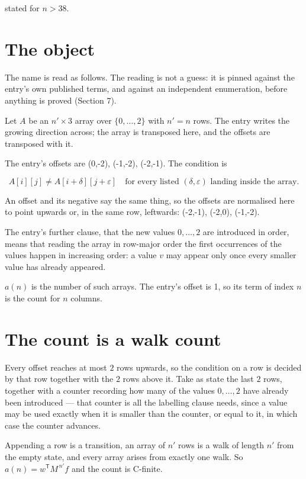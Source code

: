 \documentclass[11pt]{article}
\theoremstyle{definition}
\begin{document}
stated for $n > 38$.

\section{The object}

The name is read as follows. The reading is not a guess: it is pinned against the entry's own published terms, and against an independent enumeration, before anything is proved (Section 7).

Let $A$ be an $n' \times 3$ array over $\{0,\dots,2\}$ with $n' = n$ rows. The entry writes the growing direction across; the array is transposed here, and the offsets are transposed with it.

The entry's offsets are (0,-2), (-1,-2), (-2,-1). The condition is

\[A[i][j] \ne A[i{+}\delta][j{+}\varepsilon]\quad\text{for every listed }(\delta,\varepsilon)\text{ landing inside the array.}\]

An offset and its negative say the same thing, so the offsets are normalised here to point upwards or, in the same row, leftwards: (-2,-1), (-2,0), (-1,-2).

The entry's further clause, that the new values $0,\dots,2$ are introduced in order, means that reading the array in row-major order the first occurrences of the values happen in increasing order: a value $v$ may appear only once every smaller value has already appeared.

$a(n)$ is the number of such arrays. The entry's offset is 1, so its term of index $n$ is the count for $n$ columns.

\section{The count is a walk count}

Every offset reaches at most $2$ rows upwards, so the condition on a row is decided by that row together with the $2$ rows above it. Take as state the last $2$ rows, together with a counter recording how many of the values $0,\dots,2$ have already been introduced --- that counter is all the labelling clause needs, since a value may be used exactly when it is smaller than the counter, or equal to it, in which case the counter advances.

Appending a row is a transition, an array of $n'$ rows is a walk of length $n'$ from the empty state, and every array arises from exactly one walk. So $a(n) = w^{\mathsf T}M^{\,n'}f$ and the count is C-finite.
\end{document}
